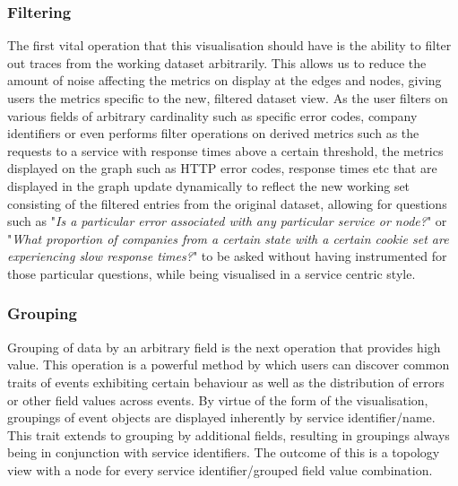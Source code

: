 \documentclass[12pt,pdftex,titlepage]{report}
\begin{document}
                \subsubsection{Filtering}
                    The first vital operation that this visualisation should have is the ability to filter out traces from the working dataset arbitrarily. This allows us to reduce the amount of noise affecting the metrics
                    on display at the edges and nodes, giving users the metrics specific to the new, filtered dataset view. As the user filters on various fields of arbitrary cardinality such as specific error codes,
                    company identifiers or even performs filter operations on derived metrics such as the requests to a service with response times above a certain threshold, the metrics displayed on the graph such as HTTP error codes, 
                    response times etc that are displayed in the graph update dynamically to reflect the new working set consisting of the filtered entries from the original dataset, allowing for questions such as "\textit{Is a particular 
                    error associated with any particular service or node?}" or "\textit{What proportion of companies from a certain state with a certain cookie set are experiencing slow response times?}" to be asked without having 
                    instrumented for those particular questions, while being visualised in a service centric style.

                \subsubsection{Grouping}
                    Grouping of data by an arbitrary field is the next operation that provides high value. This operation is a powerful method by which users can discover common traits of events exhibiting certain behaviour as well as the
                    distribution of errors or other field values across events. By virtue of the form of the visualisation, groupings of event objects are displayed inherently by service identifier/name. This trait extends to grouping by
                    additional fields, resulting in groupings always being in conjunction with service identifiers. The outcome of this is a topology view with a node for every service identifier/grouped field value combination. 
                    
\end{document}
